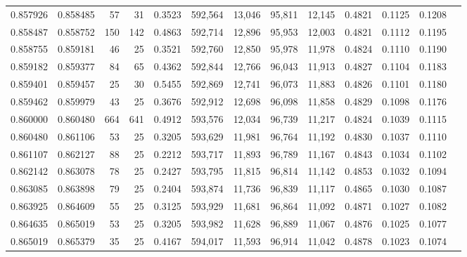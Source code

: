 \begin{tabular}{rrrrrrrrrrrrr}
0.857926 & 0.858485 &    57 &  31 &                                     0.3523 & 592,564 &  13,046 &  95,811 &  12,145 & 0.4821 & 0.1125 & 0.1208 \\
0.858487 & 0.858752 &   150 & 142 &                                     0.4863 & 592,714 &  12,896 &  95,953 &  12,003 & 0.4821 & 0.1112 & 0.1195 \\
0.858755 & 0.859181 &    46 &  25 &                                     0.3521 & 592,760 &  12,850 &  95,978 &  11,978 & 0.4824 & 0.1110 & 0.1190 \\
0.859182 & 0.859377 &    84 &  65 &                                     0.4362 & 592,844 &  12,766 &  96,043 &  11,913 & 0.4827 & 0.1104 & 0.1183 \\
0.859401 & 0.859457 &    25 &  30 &                                     0.5455 & 592,869 &  12,741 &  96,073 &  11,883 & 0.4826 & 0.1101 & 0.1180 \\
0.859462 & 0.859979 &    43 &  25 &                                     0.3676 & 592,912 &  12,698 &  96,098 &  11,858 & 0.4829 & 0.1098 & 0.1176 \\
0.860000 & 0.860480 &   664 & 641 &                                     0.4912 & 593,576 &  12,034 &  96,739 &  11,217 & 0.4824 & 0.1039 & 0.1115 \\
0.860480 & 0.861106 &    53 &  25 &                                     0.3205 & 593,629 &  11,981 &  96,764 &  11,192 & 0.4830 & 0.1037 & 0.1110 \\
0.861107 & 0.862127 &    88 &  25 &                                     0.2212 & 593,717 &  11,893 &  96,789 &  11,167 & 0.4843 & 0.1034 & 0.1102 \\
0.862142 & 0.863078 &    78 &  25 &                                     0.2427 & 593,795 &  11,815 &  96,814 &  11,142 & 0.4853 & 0.1032 & 0.1094 \\
0.863085 & 0.863898 &    79 &  25 &                                     0.2404 & 593,874 &  11,736 &  96,839 &  11,117 & 0.4865 & 0.1030 & 0.1087 \\
0.863925 & 0.864609 &    55 &  25 &                                     0.3125 & 593,929 &  11,681 &  96,864 &  11,092 & 0.4871 & 0.1027 & 0.1082 \\
0.864635 & 0.865019 &    53 &  25 &                                     0.3205 & 593,982 &  11,628 &  96,889 &  11,067 & 0.4876 & 0.1025 & 0.1077 \\
0.865019 & 0.865379 &    35 &  25 &                                     0.4167 & 594,017 &  11,593 &  96,914 &  11,042 & 0.4878 & 0.1023 & 0.1074 \\

\end{tabular}
